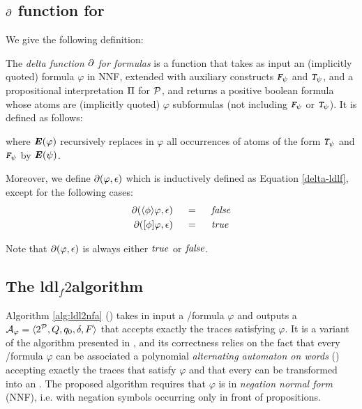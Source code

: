 \subsection{$\partial$ function for \LDLf} \label{ldlf-delta-section}
We give the following definition:
\begin{definition}\label{ldlf-delta-def}
	The \emph{delta function $\partial$ for \LDLf formulas} is a function that takes as input an (implicitly quoted) \LDLf
	formula $\varphi$ in NNF, extended with auxiliary constructs $\textit{\textbf{\texttt{F}}}_{\psi}$ and $\textit{\textbf{\texttt{T}}}_{\psi}$, and a propositional interpretation $\Pi$ for $\mathcal{P}$, and returns a positive boolean formula whose atoms are (implicitly
	quoted) $\varphi$ subformulas (not including $\textit{\textbf{\texttt{F}}}_{\psi}$ or $\textit{\textbf{\texttt{T}}}_{\psi}$). It is defined as follows:
	
	where $\textbf{\textit{E}} (\varphi)$ recursively replaces in $\varphi$ all occurrences of atoms of the form $\textit{\textbf{\texttt{T}}}_{\psi}$ and $\textit{\textbf{\texttt{F}}}_{\psi}$ by $\textbf{\textit{E}}(\psi)$.
	
	Moreover, we define $\partial\lparen \varphi, \epsilon\rparen$ which is inductively defined as Equation \ref{delta-ldlf}, except for the following cases:
	\begin{align}
	\begin{aligned}
	\partial\lparen \langle \phi \rangle\varphi, \epsilon\rparen 	\hspace*{.18in} &= \hspace*{.18in}   \mathit{false}\\
	\partial\lparen [\phi]\varphi, \epsilon\rparen 	\hspace*{.18in} &= \hspace*{.18in}   \mathit{true}
	\label{delta-ldlf-eps}
	\end{aligned}					
	\end{align}
\end{definition}
Note that $\partial\lparen \varphi, \epsilon\rparen$ is always either $\mathit{true}$ or $\mathit{false}$.
\subsection{The {\sc ldl}$_f2$\NFA algorithm}
 Algorithm \ref{alg:ldl2nfa} (\LDLfToNFA) takes in input a \LDLf/\LTLf formula $\varphi$ and outputs a \NFA $\mathcal{A}_\varphi = \langle 2^{\mathcal{P}}, Q, q_0, \delta, F \rangle$ that accepts exactly the traces satisfying $\varphi$. It is a variant of the algorithm presented in \citep{DeGiacomo:2015:SLL:2832415.2832466}, and its correctness relies on the fact that every \LDLf/\LTLf formula $\varphi$ can be associated a polynomial \emph{alternating automaton on words} (\AFW) accepting exactly the traces that satisfy $\varphi$ and that every \AFW can be transformed into an \NFA \citep{de2013linear}.
The proposed algorithm requires that $\varphi$ is in \emph{negation normal form} (NNF), i.e. with negation symbols occurring only in front of propositions. 

